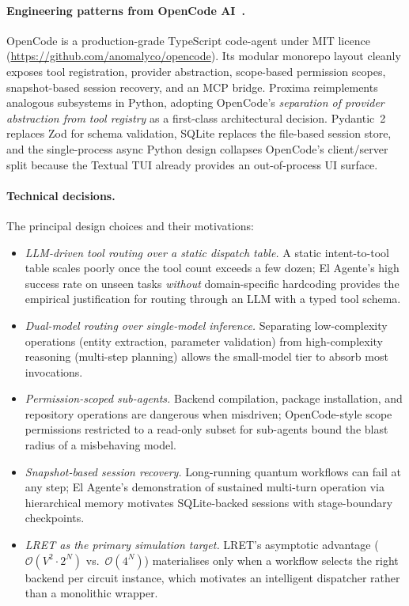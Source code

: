 \documentclass[11pt,a4paper]{article}
\begin{document}
\paragraph{Engineering patterns from OpenCode AI~\cite{opencode2025}.} OpenCode
is a production-grade TypeScript code-agent under MIT licence
(\url{https://github.com/anomalyco/opencode}). Its modular monorepo layout
cleanly exposes tool registration, provider abstraction, scope-based permission
scopes, snapshot-based session recovery, and an MCP bridge. Proxima
reimplements analogous subsystems in Python, adopting OpenCode's
\emph{separation of provider abstraction from tool registry} as a first-class
architectural decision. Pydantic~2 replaces Zod for schema validation, SQLite
replaces the file-based session store, and the single-process async Python
design collapses OpenCode's client/server split because the Textual TUI already
provides an out-of-process UI surface.

\paragraph{Technical decisions.} The principal design choices and their
motivations:
\begin{itemize}[leftmargin=1.5cm]
  \item \emph{LLM-driven tool routing over a static dispatch table.} A static
        intent-to-tool table scales poorly once the tool count exceeds a few
        dozen; El Agente's high success rate on unseen tasks
        \emph{without} domain-specific hardcoding provides the empirical
        justification for routing through an LLM with a typed tool schema.
  \item \emph{Dual-model routing over single-model inference.} Separating
        low-complexity operations (entity extraction, parameter validation) from
        high-complexity reasoning (multi-step planning) allows the small-model
        tier to absorb most invocations.
  \item \emph{Permission-scoped sub-agents.} Backend compilation, package
        installation, and repository operations are dangerous when misdriven;
        OpenCode-style scope permissions restricted to a read-only subset for
        sub-agents bound the blast radius of a misbehaving model.
  \item \emph{Snapshot-based session recovery.} Long-running quantum workflows
        can fail at any step; El Agente's demonstration of sustained multi-turn
        operation via hierarchical memory motivates SQLite-backed sessions with
        stage-boundary checkpoints.
  \item \emph{LRET as the primary simulation target.} LRET's asymptotic advantage
        ($\mathcal{O}(V^2\cdot 2^N)$ vs.\ $\mathcal{O}(4^N)$) materialises only
        when a workflow selects the right backend per circuit instance, which
        motivates an intelligent dispatcher rather than a monolithic wrapper.
\end{itemize}
\end{document}
